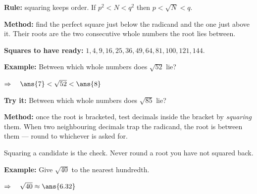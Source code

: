 \documentclass[12pt]{article}
\begin{document}


\begin{formulabox}
\textbf{Rule:} squaring keeps order. If $p^2 < N < q^2$ then $p < \sqrt{N} < q$.
\par\smallskip
\textbf{Method:} find the perfect square just below the radicand and the one just above
it. Their roots are the two consecutive whole numbers the root lies between.
\par\smallskip
\textbf{Squares to have ready:} $1, 4, 9, 16, 25, 36, 49, 64, 81, 100, 121, 144$.
\end{formulabox}

\begin{examplebox}
\textbf{Example:} \quad Between which whole numbers does $\sqrt{52}$ lie?

$\Rightarrow\quad \ans{7} < \sqrt{52} < \ans{8}$
\end{examplebox}

\begin{tryitbox}
\textbf{Try it:} \quad Between which whole numbers does $\sqrt{85}$ lie?\\[2pt]
\end{tryitbox}


\begin{formulabox}
\textbf{Method:} once the root is bracketed, test decimals inside the bracket by
\emph{squaring} them. When two neighbouring decimals trap the radicand, the root is
between them --- round to whichever is asked for.
\par\smallskip
Squaring a candidate is the check. Never round a root you have not squared back.
\end{formulabox}

\begin{examplebox}
\textbf{Example:} \quad Give $\sqrt{40}$ to the nearest hundredth.

$\Rightarrow\quad \sqrt{40} \approx \ans{6.32}$
\end{examplebox}
\end{document}
